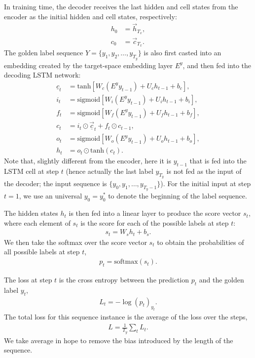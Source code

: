 \documentclass[11pt,a4paper]{article}
\begin{document}
In training time, the decoder receives the last hidden and cell states from the encoder as the initial hidden and cell states, respectively:
\begin{align}
	h_0 &= \overrightarrow{h}_{T_x}, \\
	c_0 &= \overrightarrow{c}_{T_x}.
\end{align}
The golden label sequence $Y = \{y_1, y_2, \dots, y_{T_y}\}$ is also first casted into an embedding created by the target-space embedding layer $E^y$, and then fed into the decoding LSTM network:
\begin{align}
	\underline{c}_t &= \textrm{tanh}\left[ W_c (E^y y_{t-1}) + U_c h_{t-1} + b_c \right], \\
	i_t &= \textrm{sigmoid}\left[ W_i (E^y y_{t-1}) + U_i h_{t-1} + b_i \right], \\
	f_t &= \textrm{sigmoid}\left[ W_f (E^y y_{t-1}) + U_f h_{t-1} + b_f \right], \\
	c_t &= i_t \odot \overrightarrow{\underline{c}}_t + f_t \odot c_{t-1}, \\
	o_t &= \textrm{sigmoid}\left[ W_o (E^y y_{t-1}) + U_o h_{t-1} + b_o \right], \\
	h_t &= o_t \odot \textrm{tanh}(c_t).
\end{align}
Note that, slightly different from the encoder, here it is $y_{t-1}$ that is fed into the LSTM cell at step $t$ (hence actually the last label $y_{T_y}$ is not fed as the input of the decoder; the input sequence is $\{y_0, y_1, \dots, y_{T_y - 1}\}$). For the initial input at step $t = 1$, we use an universal $y_0 = y_0^*$ to denote the beginning of the label sequence.

The hidden states $h_t$ is then fed into a linear layer to produce the score vector $s_t$, where each element of $s_t$ is the score for each of the possible labels at step $t$:
\begin{align}
	s_t = W_s h_t + b_s.
\end{align}
We then take the softmax over the score vector $s_t$ to obtain the probabilities of all possible labels at step $t$,
\begin{align}
	\label{eq:pt} p_t = \textrm{softmax}(s_t).
\end{align}

The loss at step $t$ is the cross entropy between the prediction $p_t$ and the golden label $y_t$,
\begin{align}
	L_t = -\log (p_t)_{y_t}.
\end{align}
The total loss for this sequence instance is the average of the loss over the steps,
\begin{align}
	L = \frac{1}{T_y} \sum_t L_t.
\end{align}
We take average in hope to remove the bias introduced by the length of the sequence.
\end{document}
